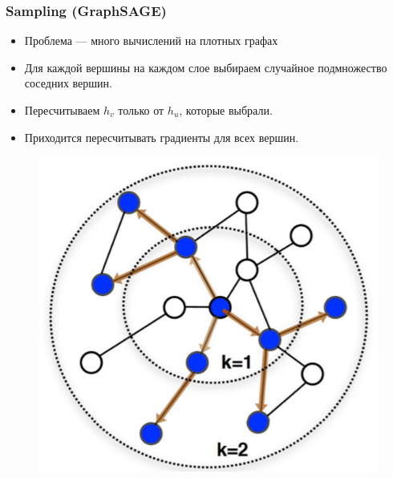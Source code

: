 \documentclass{beamer}
\begin{document}
\begin{frame}
\frametitle{Sampling (GraphSAGE)}
\begin{multicols}{2}
\begin{itemize}
	\item Проблема --- много вычислений на плотных графах
	\item Для каждой вершины на каждом слое выбираем случайное подмножество соседних вершин.
	\item Пересчитываем $h_v$ только от $h_u$, которые выбрали.
	\item Приходится пересчитывать градиенты для всех вершин.
\end{itemize}
\columnbreak
	\begin{figure}
		\includegraphics[width=\columnwidth]{GraphSAGE.png}
	\end{figure}
\end{multicols}
\end{frame}
\end{document}
